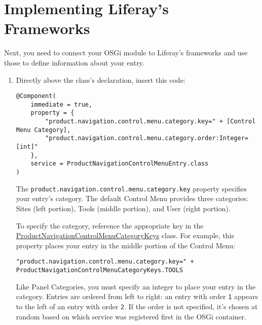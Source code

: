 \section{Implementing Liferay's
Frameworks}\label{implementing-liferays-frameworks-1}

Next, you need to connect your OSGi module to Liferay's frameworks and
use those to define information about your entry.

\begin{enumerate}
\def\labelenumi{\arabic{enumi}.}
\item
  Directly above the class's declaration, insert this code:

\begin{verbatim}
@Component(
    immediate = true,
    property = {
        "product.navigation.control.menu.category.key=" + [Control Menu Category],
        "product.navigation.control.menu.category.order:Integer=[int]"
    },
    service = ProductNavigationControlMenuEntry.class
)
\end{verbatim}

  The \texttt{product.navigation.control.menu.category.key} property
  specifies your entry's category. The default Control Menu provides
  three categories: Sites (left portion), Tools (middle portion), and
  User (right portion).

  To specify the category, reference the appropriate key in the
  \href{https://docs.liferay.com/dxp/apps/product-navigation/latest/javadocs/com/liferay/product/navigation/control/menu/constants/ProductNavigationControlMenuCategoryKeys.html}{ProductNavigationControlMenuCategoryKeys}
  class. For example, this property places your entry in the middle
  portion of the Control Menu:

\begin{verbatim}
"product.navigation.control.menu.category.key=" + ProductNavigationControlMenuCategoryKeys.TOOLS
\end{verbatim}

  Like Panel Categories, you must specify an integer to place your entry
  in the category. Entries are ordered from left to right: an entry with
  order \texttt{1} appears to the left of an entry with order
  \texttt{2}. If the order is not specified, it's chosen at random based
  on which service was registered first in the OSGi container.


\end{enumerate}
